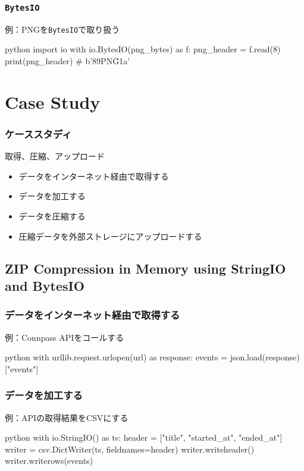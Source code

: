 \documentclass[aspectratio=169,dvipdfmx,14pt,notheorems]{beamer}
\theoremstyle{definition}
\begin{document}
\begin{frame}[fragile]\frametitle{\texttt{BytesIO}}

\begin{exampleblock}{例：PNGを\texttt{BytesIO}で取り扱う}
\begin{pygments}{python}
import io
with io.BytesIO(png_bytes) as f:
    png_header = f.read(8)
    print(png_header)  # b'\x89PNG\r\n\x1a\n'
\end{pygments}
\end{exampleblock}

\end{frame}

\section{Case Study}

\begin{frame}\frametitle{ケーススタディ}
\begin{block}{取得、圧縮、アップロード}
\begin{itemize}
\item データをインターネット経由で取得する
\item データを加工する
\item データを圧縮する
\item 圧縮データを外部ストレージにアップロードする

\end{itemize}
\end{block}
\end{frame}

\subsection{ZIP Compression in Memory using StringIO and BytesIO}

\begin{frame}[fragile]\frametitle{データをインターネット経由で取得する}

\begin{exampleblock}{例：Connpass APIをコールする}
\begin{pygments}{python}
with urllib.request.urlopen(url) as response:
    events = json.load(response)["events"]
\end{pygments}
\end{exampleblock}

\end{frame}

\begin{frame}[fragile]\frametitle{データを加工する}

\begin{exampleblock}{例：APIの取得結果をCSVにする}
\begin{pygments}{python}
with io.StringIO() as ts:
    header = ["title", "started_at", "ended_at"]
    writer = csv.DictWriter(ts, fieldnames=header)
    writer.writeheader()
    writer.writerows(events)
\end{pygments}
\end{exampleblock}

\end{frame}
\end{document}
